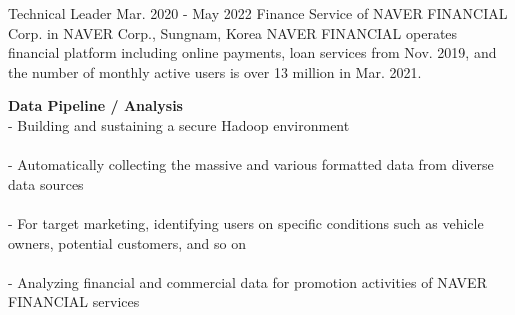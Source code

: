 \begin{cventries}
    \cventry
        {Technical Leader} %
        {Mar. 2020 - May 2022} %
        {Finance Service of NAVER FINANCIAL Corp. in NAVER Corp., } %
        {Sungnam, Korea}%
        { %
            NAVER FINANCIAL operates financial platform including online payments, loan services from Nov. 2019, and the number of monthly active users is over 13 million in Mar. 2021.
        }
        { %
            \begin{cvitems}
                \item {
                    {\bf Data Pipeline / Analysis} \\
                    - Building and sustaining a secure Hadoop environment \\
                         \\
                    - Automatically collecting the massive and various formatted data from diverse data sources \\
                         \\
                    - For target marketing, identifying users on specific conditions such as vehicle owners, potential customers, and so on \\
                         \\
                    - Analyzing financial and commercial data for promotion activities of NAVER FINANCIAL services \\
                         \nn
                }
            \end{cvitems}
        }


\end{cventries}
